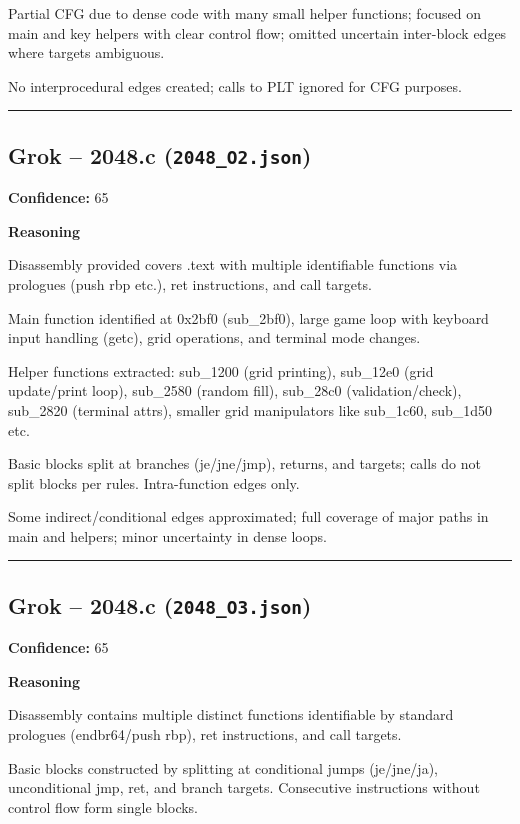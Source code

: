 Partial CFG due to dense code with many small helper functions; focused on main and key helpers with clear control flow; omitted uncertain inter-block edges where targets ambiguous.

No interprocedural edges created; calls to PLT ignored for CFG purposes.

\bigskip
\hrule
\bigskip

\subsection{Grok -- 2048.c (\texttt{2048\_O2.json})}

\textbf{Confidence:} 65

\textbf{Reasoning}

Disassembly provided covers .text with multiple identifiable functions via prologues (push rbp etc.), ret instructions, and call targets.

Main function identified at 0x2bf0 (sub\_2bf0), large game loop with keyboard input handling (getc), grid operations, and terminal mode changes.

Helper functions extracted: sub\_1200 (grid printing), sub\_12e0 (grid update/print loop), sub\_2580 (random fill), sub\_28c0 (validation/check), sub\_2820 (terminal attrs), smaller grid manipulators like sub\_1c60, sub\_1d50 etc.

Basic blocks split at branches (je/jne/jmp), returns, and targets; calls do not split blocks per rules. Intra-function edges only.

Some indirect/conditional edges approximated; full coverage of major paths in main and helpers; minor uncertainty in dense loops.

\bigskip
\hrule
\bigskip

\subsection{Grok -- 2048.c (\texttt{2048\_O3.json})}

\textbf{Confidence:} 65

\textbf{Reasoning}

Disassembly contains multiple distinct functions identifiable by standard prologues (endbr64/push rbp), ret instructions, and call targets.

Basic blocks constructed by splitting at conditional jumps (je/jne/ja), unconditional jmp, ret, and branch targets. Consecutive instructions without control flow form single blocks.

